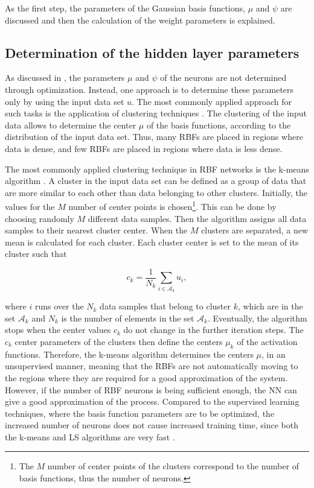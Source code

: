 As the first step, the parameters of the Gaussian basis functions, $\mu$ and $\psi$ are discussed and then the calculation of the weight parameters is explained. 

\subsection{Determination of the hidden layer parameters}
\label{determination_hidden_layer}

As discussed in , the parameters $\mu$ and $\psi$ of the neurons are not determined through optimization. Instead, one approach is to determine these parameters only by using the input data set $u$. The most commonly applied approach for such tasks is the application of clustering techniques \cite{nelles2013nonlinear}. The clustering of the input data allows to determine the center $\mu$ of the basis functions, according to the distribution of the input data set. Thus, many RBFs are placed in regions where data is dense, and few RBFs are placed in regions where data is less dense.  

The most commonly applied clustering technique in RBF networks is the k-means algorithm \cite{nelles2013nonlinear}. A cluster in the input data set can be defined as a group of data that are more similar to each other than data belonging to other clusters. Initially, the values for the $M$ number of center points is chosen\footnote{The $M$ number of center points of the clusters correspond to the number of basis functions, thus the number of neurons.}. This can be done by choosing randomly $M$ different data samples. Then the algorithm assigns all data samples to their nearest cluster center. When the $M$ clusters are separated, a new mean is calculated for each cluster. Each cluster center is set to the mean of its cluster such that

\begin{equation}
\label{cluster_center}
c_k = \frac{1}{N_k} \sum_{i \in \mathcal{A}_k}  u_i,
\end{equation}

where $i$ runs over the $N_k$ data samples that belong to cluster $k$, which are in the set $\mathcal{A}_k$ and $N_k$ is the number of elements in the set $\mathcal{A}_k$. Eventually, the algorithm stops when the center values $c_k$ do not change in the further iteration steps. The $c_k$ center parameters of the clusters then define the centers $\mu_k$ of the activation functions. Therefore, the k-means algorithm determines the centers $\mu$, in an unsupervised manner, meaning that the RBFs are not automatically moving to the regions where they are required for a good approximation of the system. However, if the number of RBF neurons is being sufficient enough, the NN can give a good approximation of the process. Compared to the supervised learning techniques, where the basis function parameters are to be optimized, the increased number of neurons does not cause increased training time, since both the k-means and LS algorithms are very fast \cite{nelles2013nonlinear}. 

